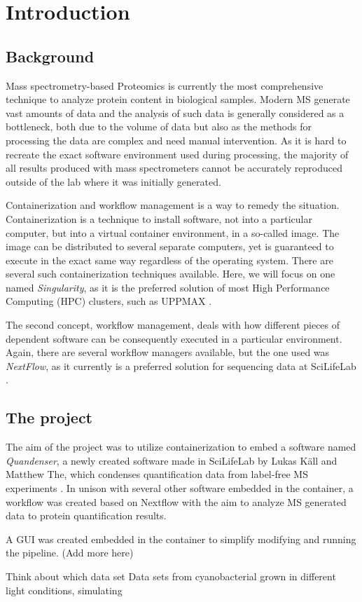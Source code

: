 \section{Introduction}

\subsection{Background}

Mass spectrometry-based Proteomics is currently the most comprehensive technique to analyze protein content in biological samples. Modern MS generate vast amounts of data and the analysis of such data is generally considered as a bottleneck, both due to the volume of data but also as the methods for processing the data are complex and need manual intervention. As it is hard to recreate the exact software environment used during processing, the majority of all results produced with mass spectrometers cannot be accurately reproduced outside of the lab where it was initially generated.

Containerization and workflow management is a way to remedy the situation. Containerization is a technique to install software, not into a particular computer, but into a virtual container environment, in a so-called image. The image can be distributed to several separate computers, yet is guaranteed to execute in the exact same way regardless of the operating system. There are several such containerization techniques available. Here, we will focus on one named \textit{Singularity}, as it is the preferred solution of most High Performance Computing (HPC) clusters, such as UPPMAX \cite{singularity} \cite{singularity-uppmax}.

The second concept, workflow management, deals with how different pieces of dependent software can be consequently executed in a particular environment. Again, there are several workflow managers available, but the one used was \textit{NextFlow}, as it currently is a preferred solution for sequencing data at SciLifeLab \cite{nextflow}.

\subsection{The project}

The aim of the project was to utilize containerization to embed a software named \textit{Quandenser}, a newly created software made in SciLifeLab by Lukas Käll and Matthew The, which condenses quantification data from label-free MS experiments \cite{quandenser}. In unison with several other software embedded in the container, a workflow was created based on Nextflow with the aim to analyze MS generated data to protein quantification results.

A GUI was created embedded in the container to simplify modifying and running the pipeline.  (Add more here)



Think about which data set
Data sets from cyanobacterial grown in different light conditions, simulating
